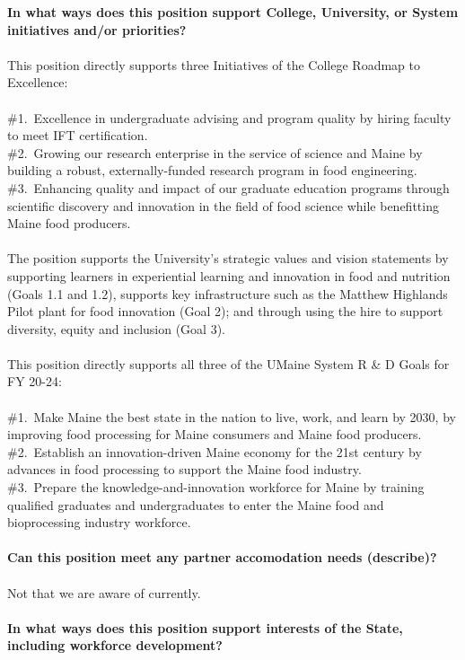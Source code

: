 \documentclass[11pt]{article}
\begin{document}
\newpage
\noindent\textbf{\rmfamily In what ways does this position support College, University, or System initiatives and/or priorities?}
\\~\\
This position directly supports three Initiatives of the College Roadmap to Excellence:\\~\\
\#1.~Excellence in undergraduate advising and program quality by hiring faculty to meet IFT certification.\\
\#2.~Growing our research enterprise in the service of science and Maine by building a robust, externally-funded research program in food engineering.\\
\#3.~Enhancing quality and impact of our graduate education programs through scientific discovery and innovation in the field of food science while benefitting Maine food producers.
\\~\\
The position supports the University's strategic values and vision statements by supporting learners in experiential learning and innovation in food and nutrition (Goals 1.1 and 1.2), supports key infrastructure such as the Matthew Highlands Pilot plant for food innovation (Goal 2); and through using the hire to support diversity, equity and inclusion (Goal 3).
\\~\\
This position directly supports all three of the UMaine System R \& D Goals for FY 20-24:\\~\\
\#1.~Make Maine the best state in the nation to live, work, and learn by 2030, by improving food processing for Maine consumers and Maine food producers. \\
\#2.~Establish an innovation-driven Maine economy for the 21st century by advances in food processing to support the Maine food industry.\\
\#3.~Prepare the knowledge-and-innovation workforce for Maine by training qualified graduates and undergraduates to enter the Maine food and bioprocessing industry workforce.\\~\\
\vfill
\noindent\textbf{\rmfamily Can this position meet any partner accomodation needs (describe)?}
\\~\\Not that we are aware of currently.\\~\\
\vfill
\noindent\textbf{\rmfamily In what ways does this position support interests of the State, including workforce development?}\\~\\
\end{document}
